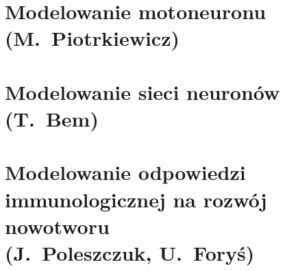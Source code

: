 \documentclass[11pt,a4paper,twoside,openright,final]{memoir}
\begin{document}
			\chapter[Modelowanie motoneuronu]{Modelowanie motoneuronu\\{\large (M.~Piotrkiewicz)}}
			
			\chapter[Modelowanie sieci neuronów]{Modelowanie sieci neuronów\\{\large (T.~Bem)}}
			
			\chapter[Modelowanie odpowiedzi immunologicznej na rozwój nowotworu]{Modelowanie odpowiedzi immunologicznej na rozwój nowotworu\\{\large (J.~Poleszczuk, U.~Foryś)}}
	
			
			

	\backmatter
		
\end{document}

